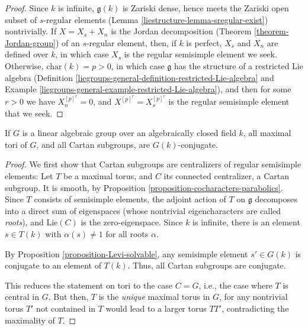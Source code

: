 \begin{proof}
 Since $k$ is infinite, $\mathfrak g(k)$ is Zariski dense, hence meets the Zariski open subset of $s$-regular elements (Lemma \ref{liestructure-lemma-sregular-exist}) nontrivially. If $X=X_s+X_n$ is the Jordan decomposition (Theorem \ref{theorem-Jordan-group}) of an $s$-regular element, then, if $k$ is perfect, $X_s$ and $X_n$ are defined over $k$, in which case $X_s$ is the regular semisimple element we seek. Otherwise, $\text{char}(k)=p>0$, in which case $\mathfrak g$ has the structure of a restricted Lie algebra (Definition \ref{liegroups-general-definition-restricted-Lie-algebra} and Example \ref{liegroups-general-example-restricted-Lie-algebra}), and then for some $r>0$ we have $X_n^{[p]^r}=0$, and $X^{[p]^r}=X_s^{[p]^r}$ is the regular semisimple element that we seek.
\end{proof}


\begin{theorem}
\label{theorem-Cartan-tori-conjugate}
If $G$ is a linear algebraic group over an algebraically closed field $k$, all maximal tori of $G$, and all Cartan subgroups, are $G(k)$-conjugate.
\end{theorem}


\begin{proof}
We first show that Cartan subgroups are centralizers of regular semisimple elements: Let $T$ be a maximal torus, and $C$ its connected centralizer, a Cartan subgroup. It is smooth, by Proposition \ref{proposition-cocharacters-parabolics}. Since $T$ consists of semisimple elements, the adjoint action of $T$ on $\mathfrak g$ decomposes into a direct sum of eigenspaces (whose nontrivial eigencharacters are called \emph{roots}), and $\text{Lie}(C)$ is the zero-eigenspace. Since $k$ is infinite, there is an element $s\in T(k)$ with $\alpha(s)\ne 1$ for all roots $\alpha$. 

By Proposition \ref{proposition-Levi-solvable}, any semisimple element $s'\in G(k)$ is conjugate to an element of $T(k)$. Thus, all Cartan subgroups are conjugate. 

This reduces the statement on tori to the case $C=G$, i.e., the case where $T$ is central in $G$. But then, $T$ is the \emph{unique} maximal torus in $G$, for any nontrivial torus $T'$ not contained in $T$ would lead to a larger torus $TT'$, contradicting the maximality of $T$.
\end{proof}





